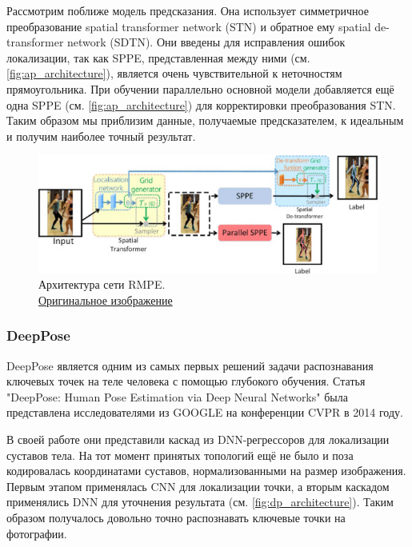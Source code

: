 Рассмотрим поближе модель предсказания. Она использует симметричное преобразование spatial transformer network (STN) и обратное ему spatial de-transformer network (SDTN). Они введены для исправления ошибок локализации, так как SPPE, представленная между ними (см. \autoref{fig:ap_architecture}), является очень чувствительной к неточностям прямоугольника. При обучении параллельно основной модели добавляется ещё одна SPPE (см. \autoref{fig:ap_architecture}) для корректировки преобразования STN. Таким образом мы приблизим данные, получаемые предсказателем, к идеальным и получим наиболее точный результат.

\begin{figure}[h]
	\centering
	\includegraphics[width=\textwidth]{./images/AlphaPose_architecture}
	\caption{Архитектура сети RMPE.\\ \href{https://ieeexplore.ieee.org/mediastore_new/IEEE/content/media/8234942/8237262/8237518/8237518-fig-4-source-small.gif}{Оригинальное изображение}}
	\label{fig:ap_architecture}
\end{figure}



\subsubsection{DeepPose}

DeepPose является одним из самых первых решений задачи распознавания ключевых точек на теле человека с помощью глубокого обучения. Статья "DeepPose: Human Pose Estimation via Deep Neural Networks"{} \cite{DeepPose} была представлена исследователями из GOOGLE на конференции CVPR в 2014 году.

В своей работе они представили каскад из DNN-регрессоров для локализации суставов тела. На тот момент принятых топологий ещё не было и поза кодировалась координатами суставов, нормализованными на размер изображения.
Первым этапом применялась CNN для локализации точки, а вторым каскадом применялись DNN для уточнения результата (см. \autoref{fig:dp_architecture}). Таким образом получалось довольно точно распознавать ключевые точки на фотографии.


